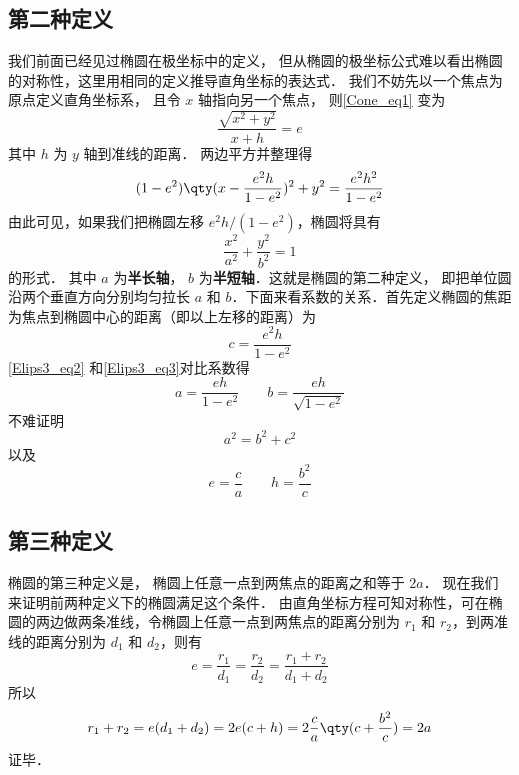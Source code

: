 

\subsection{第二种定义}
我们前面已经见过椭圆在极坐标中的定义， 但从椭圆的极坐标公式难以看出椭圆的对称性，这里用相同的定义推导直角坐标的表达式． 我们不妨先以一个焦点为原点定义直角坐标系， 且令 $x$ 轴指向另一个焦点， 则\autoref{Cone_eq1} 变为
\begin{equation}
\frac{\sqrt {x^2 + y^2} }{x + h} = e
\end{equation}
其中 $h$ 为 $y$ 轴到准线的距离． 两边平方并整理得
\begin{equation}\label{Elips3_eq2}
(1 - e^2) \qty( x - \frac{e^2 h}{1 - e^2} )^2 + y^2 = \frac{e^2 h^2}{1 - e^2}
\end{equation}
由此可见，如果我们把椭圆左移 $e^2 h/(1 - e^2)$，椭圆将具有
\begin{equation}\label{Elips3_eq3}
\frac{x^2}{a^2} + \frac{y^2}{b^2} = 1
\end{equation}
的形式． 其中 $a$ 为\textbf{半长轴}， $b$ 为\textbf{半短轴}．这就是椭圆的第二种定义， 即把单位圆沿两个垂直方向分别均匀拉长 $a$ 和 $b$．下面来看系数的关系．首先定义椭圆的焦距为焦点到椭圆中心的距离（即以上左移的距离）为
\begin{equation}
c = \frac{e^2 h}{1 - e^2}
\end{equation}
\autoref{Elips3_eq2} 和\autoref{Elips3_eq3}对比系数得
\begin{equation}
a = \frac{eh}{1 - e^2} \qquad b = \frac{eh}{\sqrt {1 - e^2} }
\end{equation}
不难证明
\begin{equation}
a^2 = b^2 + c^2
\end{equation}
以及
\begin{equation}
e = \frac{c}{a} \qquad h = \frac{b^2}{c}
\end{equation}

\subsection{第三种定义}
椭圆的第三种定义是， 椭圆上任意一点到两焦点的距离之和等于 $2a$． 现在我们来证明前两种定义下的椭圆满足这个条件． 由直角坐标方程可知对称性，可在椭圆的两边做两条准线，令椭圆上任意一点到两焦点的距离分别为 $r_1$ 和 $r_2$，到两准线的距离分别为 $d_1$ 和 $d_2$，则有
\begin{equation}
e = \frac{r_1}{d_1} = \frac{r_2}{d_2} = \frac{r_1 + r_2}{d_1 + d_2}
\end{equation}
所以
\begin{equation}
{r_1} + {r_2} = e(d_1+d_2) = 2e(c + h) = 2\frac{c}{a} \qty( c + \frac{b^2}{c} ) = 2a
\end{equation}
证毕．
